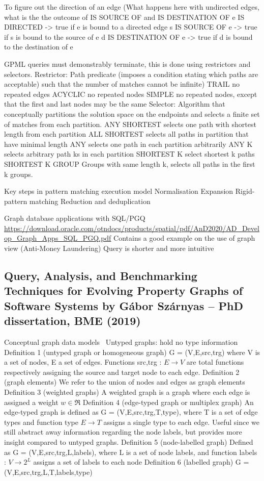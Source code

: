 To figure out the direction of an edge (What happens here with undirected edges, what is the the outcome of IS SOURCE OF and IS DESTINATION OF
e IS DIRECTED -> true if e is bound to a directed edge
s IS SOURCE OF e -> true if s is bound to the source of e
d IS DESTINATION OF e -> true if d is bound to the destination of e 

GPML queries must demonstrably terminate, this is done using restrictors and selectors. 
Restrictor: Path predicate (imposes a condition stating which paths are acceptable) such that the number of matches cannot be infinite) 
TRAIL no repeated edges
ACYCLIC no repeated nodes
SIMPLE no repeated nodes, except that the first and last nodes may be the same
Selector: Algorithm that conceptually partitions the solution space on the endpoints and selects a finite set of matches from each partition. 
ANY SHORTEST selects one path with shortest length from each partition
ALL SHORTEST selects all paths in partition that have minimal length
ANY selects one path in each partition arbitrarily
ANY  K selects arbitrary path ks in each partition
SHORTEST K select shortest k paths
SHORTEST K GROUP Groups with same length k, selects all paths in the first k groups. 

Key steps in pattern matching execution model 
Normalisation
Expansion 
Rigid-pattern matching
Reduction and deduplication

Graph database applications with SQL/PGQ
\url{https://download.oracle.com/otndocs/products/spatial/pdf/AnD2020/AD_Develop_Graph_Apps_SQL_PGQ.pdf}
Contains a good example on the use of graph view (Anti-Money Laundering)
Query is shorter and more intuitive

\subsection{Query, Analysis, and Benchmarking Techniques for Evolving Property Graphs of Software Systems by Gábor Szárnyas – PhD dissertation, BME (2019)}

Conceptual graph data models~\cite{Szrnyas2019QueryAA}
Untyped graphs: hold no type information
Definition 1 (untyped graph or homogeneous graph) G = (V,E,src,trg) where V is a set of nodes, E a set of edges. Functions src,trg : $E \rightarrow V$ are total functions respectively assigning the source and target node to each edge. 
Definition 2 (graph elements) We refer to the union of nodes and edges as graph elements
Definition 3 (weighted graphs) A weighted graph is a graph where each edge is assigned a weight $w \in \Re$
Definition 4 (edge-typed graph or multiplex graph) An edge-typed graph is defined as G = (V,E,src,trg,T,type), where T is a set of edge types and function type $E \rightarrow T$ assigns a single type to each edge. Useful since we still abstract away information regarding the node labels, but provides more insight compared to untyped graphs. 
Definition 5 (node-labelled graph) Defined as G = (V,E,src,trg,L,labels), where L is a set of node labels, and function labels : $V \rightarrow 2^L$ assigns a set of labels to each node
Definition 6 (labelled graph) G = (V,E,src,trg,L,T,labels,type)

